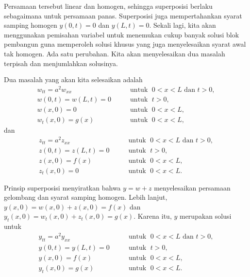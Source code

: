 Persamaan tersebut linear dan homogen,
sehingga superposisi berlaku sebagaimana untuk
persamaan panas.
Superposisi juga mempertahankan syarat samping homogen 
$y(0,t)=0$ dan $y(L,t)=0$.
Sekali lagi, kita akan menggunakan pemisahan variabel untuk menemukan
cukup banyak solusi blok pembangun guna memperoleh solusi khusus
yang juga menyelesaikan syarat awal tak homogen.  Ada
satu perubahan.  Kita akan menyelesaikan dua masalah terpisah
dan menjumlahkan solusinya.

Dua masalah yang akan kita selesaikan adalah
\begin{equation} \label{wave:weq}
\begin{array}{ll}
w_{tt} = a^2 w_{xx} & \qquad \text{untuk } \; 0 < x < L \text{ dan } t > 0, \\
w(0,t) = w(L,t) = 0 & \qquad \text{untuk } \; t > 0,  \\
w(x,0) = 0 & \qquad \text{untuk } \; 0 < x < L , \\
w_t(x,0) = g(x) & \qquad \text{untuk } \; 0 < x < L ,
\end{array}
\end{equation}
dan
\begin{equation} \label{wave:zeq}
\begin{array}{ll}
z_{tt} = a^2 z_{xx} & \qquad \text{untuk } \; 0 < x < L \text{ dan } t > 0, \\
z(0,t) = z(L,t) = 0 & \qquad \text{untuk } \; t > 0,  \\
z(x,0) = f(x) & \qquad \text{untuk } \; 0 < x < L , \\
z_t(x,0) = 0 & \qquad \text{untuk } \; 0 < x < L .
\end{array}
\end{equation}

Prinsip superposisi menyiratkan bahwa
$y = w + z$ menyelesaikan persamaan gelombang dan syarat samping
homogen.
Lebih lanjut,
$y(x,0) = w(x,0) + z(x,0) = f(x)$ dan
$y_t(x,0) = w_t(x,0) + z_t(x,0) = g(x)$.  Karena itu, $y$ merupakan
solusi untuk
\begin{equation} \label{wave:yeq}
\begin{array}{ll}
y_{tt} = a^2 y_{xx}  & \qquad \text{untuk } \; 0 < x < L \text{ dan } t > 0,  \\
y(0,t) = y(L,t) = 0  & \qquad \text{untuk } \; t > 0,  \\
y(x,0) = f(x) & \qquad \text{untuk } \; 0 < x < L , \\
y_t(x,0) = g(x) & \qquad \text{untuk } \; 0 < x < L .
\end{array}
\end{equation}


